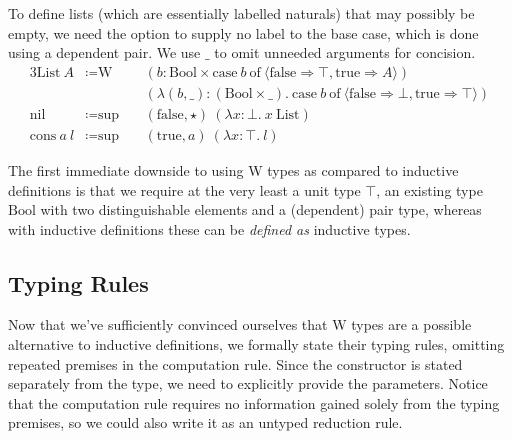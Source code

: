 \documentclass{report}
\newcommand{\List}{\const{List}}
\newcommand{\nil}{\const{nil}}
\newcommand{\cons}{\const{cons}}
\newcommand{\Bool}{\const{Bool}}
\newcommand{\true}{\const{true}}
\newcommand{\false}{\const{false}}
\newcommand{\W}{\const{W}}
\renewcommand{\sup}{\const{sup}}
\newcommand{\const}[1]{\text{#1}}
\newcommand{\case}{\const{case}}
\newcommand{\of}{\const{of}}
\begin{document}
To define lists (which are essentially labelled naturals) that may possibly be empty, we need the option to supply no label to the base case, which is done using a dependent pair. We use $\_$ to omit unneeded arguments for concision.
%
\begin{alignat*}{3}
    \List ~ A &\coloneqq \W ~ &&(b: \Bool \times \case ~ b ~ \of ~ \langle \false \Rightarrow \top, \true \Rightarrow A \rangle) \\
    &&&(\lambda (b, \_): (\Bool \times \_). ~ \case ~ b ~ \of ~ \langle \false \Rightarrow \bot, \true \Rightarrow \top \rangle) \\
    \nil &\coloneqq \sup ~ &&(\false, \star) ~ (\lambda x: \bot. ~ x ~ \List) \\
    \cons ~ a ~ l &\coloneqq \sup ~ &&(\true, a) ~ (\lambda x: \top. ~ l)
\end{alignat*}

The first immediate downside to using W types as compared to inductive definitions is that we require at the very least a unit type $\top$, an existing type $\Bool$ with two distinguishable elements and a (dependent) pair type, whereas with inductive definitions these can be \emph{defined as} inductive types.

\subsection{Typing Rules}

Now that we've sufficiently convinced ourselves that W types are a possible alternative to inductive definitions, we formally state their typing rules, omitting repeated premises in the computation rule. Since the constructor is stated separately from the type, we need to explicitly provide the parameters. Notice that the computation rule requires no information gained solely from the typing premises, so we could also write it as an untyped reduction rule.
\end{document}
